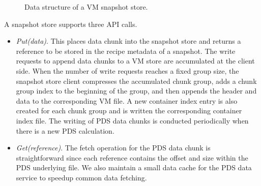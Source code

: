 \begin{figure}[htbp]
  \centering
  \caption{Data structure of a VM snapshot store.}
  \label{fig:as_arch}
\end{figure}


A snapshot  store supports three API calls.
\begin{itemize}

\item {\em Put(data)}. This places data chunk into the snapshot store and returns a reference to be stored in 
the recipe metadata of a snapshot. 
The write requests to append data chunks to a VM store are accumulated at the client side. 
When the number of write requests reaches a fixed group size, the snapshot store client compresses
the accumulated   chunk group, adds a chunk group index  to the beginning of the group, and then
appends the header and data  to the corresponding VM file.
A new container  index entry is also created for each chunk group and is written the corresponding
container index file.
The writing of PDS data chunks is conducted periodically when there is a new PDS calculation.
\item{\em Get(reference)}.
The fetch operation for the PDS data chunk is straightforward since each reference contains 
the offset and size within the PDS  underlying  file.
We also maintain a small data cache for the PDS data service to speedup common data fetching.


\end{itemize}
